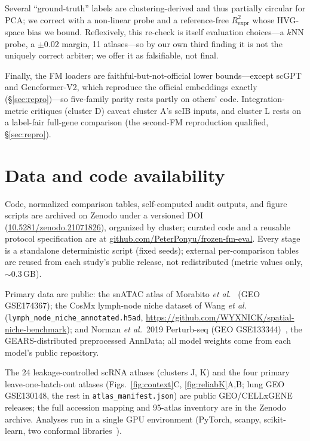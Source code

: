 \documentclass[journal]{IEEEtran}
\begin{document}
Several ``ground-truth'' labels are clustering-derived and thus partially circular for PCA; we correct with a non-linear probe and a reference-free $R^2_{\mathrm{expr}}$ whose HVG-space bias we bound. Reflexively, this re-check is itself evaluation choices---a $k$NN probe, a $\pm0.02$ margin, 11 atlases---so by our own third finding it is not the uniquely correct arbiter; we offer it as falsifiable, not final.

Finally, the FM loaders are faithful-but-not-official lower bounds---except scGPT and Geneformer-V2, which reproduce the official embeddings exactly (\S\ref{sec:repro})---so five-family parity rests partly on others' code. Integration-metric critiques (cluster D) caveat cluster A's scIB inputs, and cluster L rests on a label-fair full-gene comparison (the second-FM reproduction qualified, \S\ref{sec:repro}).

\section*{Data and code availability}
Code, normalized comparison tables, self-computed audit outputs, and figure scripts are archived on Zenodo under a versioned DOI (\href{https://doi.org/10.5281/zenodo.21071826}{10.5281/zenodo.21071826}), organized by cluster; curated code and a reusable protocol specification are at \href{https://github.com/PeterPonyu/frozen-fm-eval}{github.com/PeterPonyu/frozen-fm-eval}. Every stage is a standalone deterministic script (fixed seeds); external per-comparison tables are reused from each study's public release, not redistributed (metric values only, $\sim$0.3\,GB).

Primary data are public: the snATAC atlas of Morabito \emph{et al.}~\cite{morabito2021} (GEO GSE174367); the CosMx lymph-node niche dataset of Wang \emph{et al.}~\cite{wang2026niche} (\texttt{lymph\_node\_niche\_annotated.h5ad}, \url{https://github.com/WYXNICK/spatial-niche-benchmark}); and Norman \emph{et al.}\ 2019 Perturb-seq (GEO GSE133344)~\cite{norman2019}, the GEARS-distributed preprocessed AnnData; all model weights come from each model's public repository.

The 24 leakage-controlled scRNA atlases (clusters J, K) and the four primary leave-one-batch-out atlases (Figs.~\ref{fig:context}C, \ref{fig:reliabK}A,B; lung GEO GSE130148, the rest in \texttt{atlas\_manifest.json}) are public GEO/CELLxGENE releases; the full accession mapping and 95-atlas inventory are in the Zenodo archive. Analyses run in a single GPU environment (PyTorch, scanpy, scikit-learn, two conformal libraries~\cite{crepes,mapie}).
\end{document}
